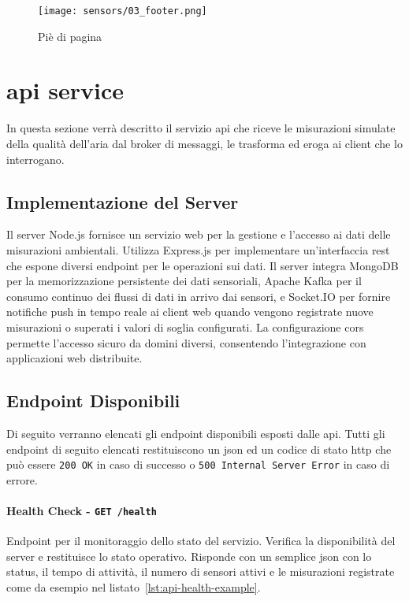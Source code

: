 \begin{figure}[H]
  \centering
  \texttt{[image: sensors/03\_footer.png]}
  \caption{Piè di pagina}
  \label{fig:sensors-footer}
\end{figure}

\section{\acrshort{api} service}

In questa sezione verrà descritto il servizio \acrshort{api} che riceve le misurazioni simulate della qualità dell'aria
dal broker di messaggi, le trasforma ed eroga ai client che lo interrogano.

\subsection{Implementazione del Server}

Il server Node.js fornisce un servizio web per la gestione e l'accesso ai dati delle misurazioni ambientali.
Utilizza Express.js per implementare un'interfaccia \acrshort{rest} che espone diversi endpoint per le operazioni sui dati.
Il server integra MongoDB per la memorizzazione persistente dei dati sensoriali, Apache Kafka per il consumo
continuo dei flussi di dati in arrivo dai sensori, e Socket.IO per fornire notifiche push in tempo reale ai client web
quando vengono registrate nuove misurazioni o superati i valori di soglia configurati. La configurazione \acrshort{cors}
permette l'accesso sicuro da domini diversi, consentendo l'integrazione con applicazioni web distribuite.

\subsection{Endpoint Disponibili}

Di seguito verranno elencati gli endpoint disponibili esposti dalle \acrshort{api}.
Tutti gli endpoint di seguito elencati restituiscono un \acrshort{json} ed un codice di stato \acrshort{http} che può
essere \texttt{200 OK} in caso di successo o \texttt{500 Internal Server Error} in caso di errore.

\paragraph{Health Check - \texttt{GET /health}}

Endpoint per il monitoraggio dello stato del servizio.
Verifica la disponibilità del server e restituisce lo stato operativo.
Risponde con un semplice \acrshort{json} con lo status, il tempo di attività, il numero di sensori attivi e le
misurazioni registrate come da esempio nel listato~\ref{lst:api-health-example}.

